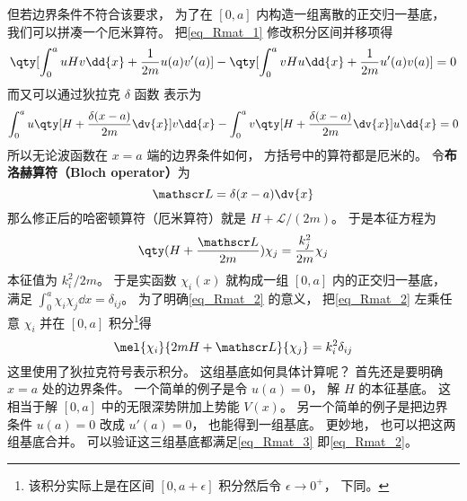 但若边界条件不符合该要求， 为了在 $[0,a]$ 内构造一组离散的正交归一基底， 我们可以拼凑一个厄米算符。 把\autoref{eq_Rmat_1} 修改积分区间并移项得
\begin{equation}
\qty[\int_{0}^{a} uHv\dd{x} + \frac{1}{2m}u(a)v'(a)] - \qty[\int_{0}^{a} vHu\dd{x} + \frac{1}{2m}u'(a)v(a)]
= 0
\end{equation}
而又可以通过狄拉克 $\delta$ 函数 表示为
\begin{equation}
\int_{0}^{a} u\qty[H + \frac{\delta(x-a)}{2m}\dv{x}] v\dd{x} -
\int_{0}^{a} v\qty[H + \frac{\delta(x-a)}{2m}\dv{x}] u\dd{x} = 0
\end{equation}
所以无论波函数在 $x=a$ 端的边界条件如何， 方括号中的算符都是厄米的。 令\textbf{布洛赫算符（Bloch operator）}为
\begin{equation}\label{eq_Rmat_6}
\mathscr L = \delta(x-a)\dv{x}
\end{equation}
那么修正后的哈密顿算符（厄米算符）就是 $H + \mathscr L/(2m)$。 于是本征方程为
\begin{equation}\label{eq_Rmat_2}
\qty(H + \frac{\mathscr L}{2m})\chi_j = \frac{k_j^2}{2m} \chi_j
\end{equation}
本征值为 ${k_i^2}/{2m}$。 于是实函数 $\chi_i(x)$ 就构成一组 $[0, a]$ 内的正交归一基底， 满足 $\int_0^a \chi_i \chi_j \dd{x} = \delta_{ij}$。 为了明确\autoref{eq_Rmat_2} 的意义， 把\autoref{eq_Rmat_2} 左乘任意 $\chi_i$ 并在 $[0,a]$ 积分\footnote{该积分实际上是在区间 $[0,a+\epsilon]$ 积分然后令 $\epsilon\to 0^+$， 下同。}得
\begin{equation}\label{eq_Rmat_3}
\mel{\chi_i}{2mH + \mathscr L}{\chi_j} = k_i^2 \delta_{ij}
\end{equation}
这里使用了狄拉克符号表示积分。 这组基底如何具体计算呢？ 首先还是要明确 $x=a$ 处的边界条件。 一个简单的例子是令 $u(a) = 0$， 解 $H$ 的本征基底。 这相当于解 $[0,a]$ 中的无限深势阱加上势能 $V(x)$。 另一个简单的例子是把边界条件 $u(a) = 0$ 改成 $u'(a) = 0$， 也能得到一组基底。 更妙地， 也可以把这两组基底合并。 可以验证这三组基底都满足\autoref{eq_Rmat_3} 即\autoref{eq_Rmat_2}。

